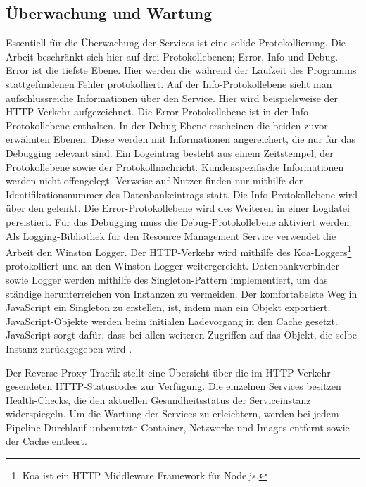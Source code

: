 \subsection{Überwachung und Wartung}
\label{subsec:ueberwachungundwartung}
Essentiell für die Überwachung der Services ist eine solide Protokollierung.
Die Arbeit beschränkt sich hier auf drei Protokollebenen; Error, Info und Debug.
Error ist die tiefste Ebene. Hier werden die während der Laufzeit des Programms
stattgefundenen Fehler protokolliert. Auf der Info-Protokollebene sieht man
aufschlussreiche Informationen über den Service. Hier wird beispielsweise
der HTTP-Verkehr aufgezeichnet. Die Error-Protokollebene ist in der Info-Protokollebene
enthalten. In der Debug-Ebene erscheinen die beiden zuvor erwähnten Ebenen. Diese
werden mit Informationen angereichert, die nur für das Debugging relevant sind.
Ein Logeintrag besteht aus einem Zeitstempel, der Protokollebene sowie der Protokollnachricht.
Kundenspezifische Informationen werden nicht offengelegt. Verweise auf Nutzer finden nur
mithilfe der Identifikationsnummer des Datenbankeintrags statt. Die Info-Protokollebene
wird über den  gelenkt. Die Error-Protokollebene wird des Weiteren in einer
Logdatei persistiert. Für das Debugging muss die Debug-Protokollebene aktiviert werden.
Als Logging-Bibliothek für den Resource Management Service verwendet die Arbeit den Winston
Logger. Der HTTP-Verkehr wird mithilfe des Koa-Loggers\footnote{Koa ist ein HTTP Middleware Framework für Node.js.} protokolliert und an den Winston
Logger weitergereicht. Datenbankverbinder sowie Logger werden mithilfe des Singleton-Pattern
implementiert, um das ständige herunterreichen von Instanzen zu vermeiden. Der komfortabelste
Weg in JavaScript ein Singleton zu erstellen, ist, indem man ein Objekt exportiert. JavaScript-Objekte
werden beim initialen Ladevorgang in den Cache gesetzt. JavaScript sorgt dafür,
dass bei allen weiteren Zugriffen auf das Objekt, die selbe Instanz zurückgegeben wird \cite{NodeJsCaching}.

Der Reverse Proxy Traefik stellt eine Übersicht über die im HTTP-Verkehr gesendeten 
HTTP-Statuscodes zur Verfügung. Die einzelnen Services besitzen Health-Checks, die den aktuellen
Gesundheitsstatus der Serviceinstanz widerspiegeln. Um die Wartung der Services zu erleichtern,
werden bei jedem Pipeline-Durchlauf unbenutzte Container, Netzwerke und Images
entfernt sowie der Cache entleert.

